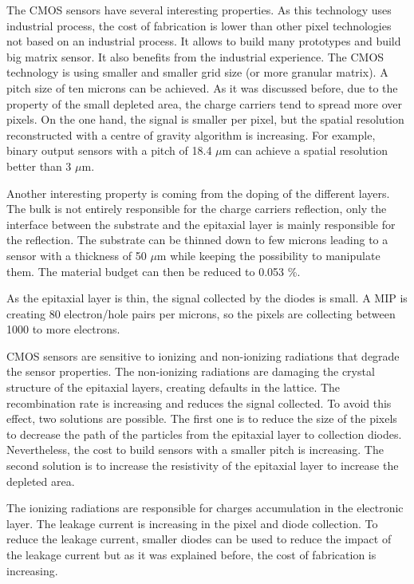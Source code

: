     The \gls{CMOS} sensors have several interesting properties.
    As this technology uses industrial process, the cost of fabrication is lower than other pixel technologies not based on an industrial process. 
    It allows to build many prototypes and build big matrix sensor.
    It also benefits from the industrial experience. 
    The CMOS technology is using smaller and smaller grid size (or more granular matrix).
    A pitch size of ten microns can be achieved. 
    As it was discussed before, due to the property of the small depleted area, the charge carriers tend to spread more over pixels.
    On the one hand, the signal is smaller per pixel, but the spatial resolution reconstructed with a centre of gravity algorithm is increasing.
    For example, binary output sensors with a pitch of 18.4 $\mu\text{m}$ can achieve a spatial resolution better than 3 $\mu\text{m}$.

    Another interesting property is coming from the doping of the different layers. 
    The bulk is not entirely responsible for the charge carriers reflection, only the interface between the substrate and the epitaxial layer is mainly responsible for the reflection.
    The substrate can be thinned down to few microns leading to a sensor with a thickness of 50 $\mu\text{m}$ while keeping the possibility to manipulate them.
    The material budget can then be reduced to 0.053 \%.

    As the epitaxial layer is thin, the signal collected by the diodes is small.
    A \gls{MIP} is creating 80 electron/hole pairs per microns, so the pixels are collecting between 1000 to more electrons.

    CMOS sensors are sensitive to ionizing and non-ionizing radiations that degrade the sensor properties.
    The non-ionizing radiations are damaging the crystal structure of the epitaxial layers, creating defaults in the lattice.
    The recombination rate is increasing and reduces the signal collected.
    To avoid this effect, two solutions are possible.
    The first one is to reduce the size of the pixels to decrease the path of the particles from the epitaxial layer to collection diodes.
    Nevertheless, the cost to build sensors with a smaller pitch is increasing.
    The second solution is to increase the resistivity of the epitaxial layer to increase the depleted area.
    
    The ionizing radiations are responsible for charges accumulation in the electronic layer.
    The leakage current is increasing in the pixel and diode collection.
    To reduce the leakage current, smaller diodes can be used to reduce the impact of the leakage current but as it was explained before, the cost of fabrication is increasing.
    
